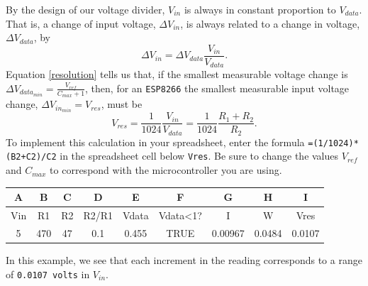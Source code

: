 \begin{enumerate}
	\smallskip
	By the design of our voltage divider, $V_{in}$ is always in constant proportion to $V_{data}$.
	That is, a change of input voltage, $\Delta V_{in}$, is always related to a change in \adc voltage, $\Delta V_{data}$, by
	\begin{equation}\label{vd9}
	\Delta V_{in} =  \Delta V_{data} \frac{V_{in}}{V_{data}}.
	\end{equation}
	Equation \ref{resolution} tells us that, if the smallest measurable \adc voltage change is $\Delta V_{data_{min}}=\frac{V_{ref}}{C_{max}+1}$, then, for an \texttt{ESP8266} the smallest measurable input voltage change, $\Delta V_{in_{min}}=V_{res}$, must be
	\begin{equation}\label{vd8}
	V_{res} = \frac{1}{1024} \frac{V_{in}}{V_{data}} = \frac{1}{1024} \frac{R_1+R_2}{R_2}.
\end{equation}
%
%
	To implement this calculation in your spreadsheet, enter the formula \lstinline{=(1/1024)*(B2+C2)/C2} in the spreadsheet cell below \texttt{Vres}. Be sure to change the values $V_{ref}$ and $C_{max}$ to correspond with the microcontroller you are using.
	\begin{table}[H]
	\centering
	\begin{small}
	\begin{tabular}{|c|c|c|c|c|c|c|c|c|}
		\hline
		\textbf{A}  & \textbf{B} & \textbf{C} & \textbf{D} & \textbf{E} & \textbf{F} & \textbf{G} & \textbf{H} & \textbf{I} \\
		\hline
		Vin  & R1 & R2 & R2/R1 & Vdata & Vdata<1? & I & W & Vres \\
		\hline
		5 & 470  & 47 & 0.1 & 0.455 & TRUE & 0.00967 & 0.0484 & 0.0107 \\
		\hline
	\end{tabular}
	\end{small}
	\end{table}
	In this example, we see that each increment in the \adc reading corresponds to a range of \texttt{0.0107 volts} in $V_{in}$.


\end{enumerate}

